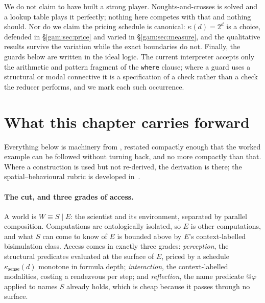 We do not claim to have built a strong player. Noughts-and-crosses is solved and
a lookup table plays it perfectly; nothing here competes with that and nothing
should. Nor do we claim the pricing schedule is canonical: $\kappa(d)=2^{d}$ is
a choice, defended in \S\ref{gam:sec:price} and varied in \S\ref{gam:sec:measure}, and
the qualitative results survive the variation while the exact boundaries do not.
Finally, the guards below are written in the ideal logic. The current
interpreter accepts only the arithmetic and pattern fragment of the
\texttt{where} clause; where a guard uses a structural or modal connective it is
a specification of a check rather than a check the reducer performs, and we mark
each such occurrence.

\section{What this chapter carries forward}\label{gam:sec:import}\label{gam:S2}

Everything below is machinery from \chSci, restated compactly enough that the
worked example can be followed without turning back, and no more compactly than
that. Where a construction is used but not re-derived, the derivation is there;
the spatial--behavioural rubric is developed in~\cite{ClassifierNote}.

\paragraph{The cut, and three grades of access.} A world is $W \equiv S \mid E$:
the scientist and its environment, separated by parallel composition.
Computations are ontologically isolated, so $E$ is other computations, and what
$S$ can come to know of $E$ is bounded above by $E$'s context-labelled
bisimulation class. Access comes in exactly three grades: \emph{perception},
the structural predicates evaluated at the surface of $E$, priced by a schedule
$\kappa_{\mathrm{sense}}(d)$ monotone in formula depth; \emph{interaction}, the
context-labelled modalities, costing a rendezvous per step; and
\emph{reflection}, the name predicate $@\varphi$ applied to names $S$ already
holds, which is cheap because it passes through no surface.

